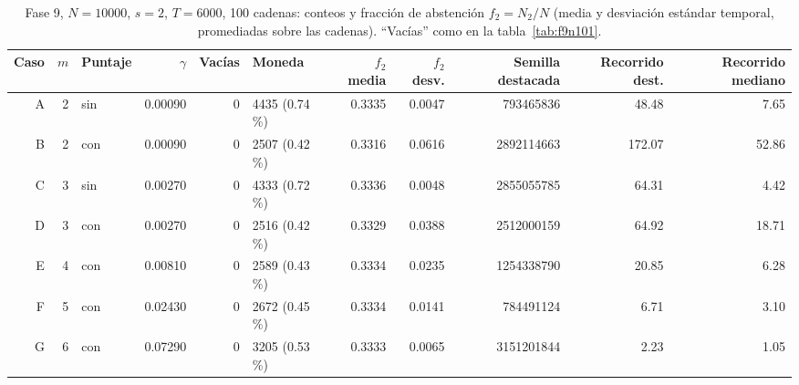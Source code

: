 \documentclass[11pt,letterpaper]{article}
\begin{document}
\begin{table}[H]
\centering
\scriptsize
\setlength{\tabcolsep}{3.5pt}
\caption{Fase 9, $N=10000$, $s=2$, $T=6000$, 100 cadenas: conteos y fracción de abstención $f_2=N_2/N$ (media y desviación estándar temporal, promediadas sobre las cadenas). ``Vacías'' como en la tabla~\ref{tab:f9n101}.}\label{tab:f9n10000}
\begin{adjustbox}{max width=\textwidth}
\begin{tabular}{rrlrrlrrrrr}
\toprule
Caso & $m$ & Puntaje & $\gamma$ & Vacías & Moneda & $f_2$ media & $f_2$ desv. & Semilla destacada & Recorrido dest. & Recorrido mediano \\
\midrule
A & 2 & sin & 0.00090 & 0 & 4435 (0.74\,\%) & 0.3335 & 0.0047 & 793465836 & 48.48 & 7.65 \\
B & 2 & con & 0.00090 & 0 & 2507 (0.42\,\%) & 0.3316 & 0.0616 & 2892114663 & 172.07 & 52.86 \\
C & 3 & sin & 0.00270 & 0 & 4333 (0.72\,\%) & 0.3336 & 0.0048 & 2855055785 & 64.31 & 4.42 \\
D & 3 & con & 0.00270 & 0 & 2516 (0.42\,\%) & 0.3329 & 0.0388 & 2512000159 & 64.92 & 18.71 \\
E & 4 & con & 0.00810 & 0 & 2589 (0.43\,\%) & 0.3334 & 0.0235 & 1254338790 & 20.85 & 6.28 \\
F & 5 & con & 0.02430 & 0 & 2672 (0.45\,\%) & 0.3334 & 0.0141 & 784491124 & 6.71 & 3.10 \\
G & 6 & con & 0.07290 & 0 & 3205 (0.53\,\%) & 0.3333 & 0.0065 & 3151201844 & 2.23 & 1.05 \\
\bottomrule
\end{tabular}
\end{adjustbox}
\end{table}
\end{document}

